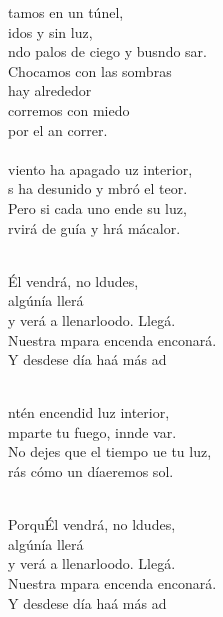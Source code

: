 \begin{cancion}%
	tamos en un túnel, \\
	idos y sin luz,\\
	ndo palos de ciego y busndo sar.\\
Chocamos con las sombras \\
	hay alrededor\\
	corremos con miedo \\
	por el an correr.\\
\jump\\
	 viento ha apagado uz interior,\\
	s ha desunido y mbró el teor.\\
	Pero si cada uno ende su luz,\\
	rvirá de guía y hrá mácalor.\\\jump\\
	\begin{chorus}%
	Él vendrá, no ldudes, \\
	algúnía llerá\\
	y verá a llenarloodo. Llegá. \\
	Nuestra mpara encenda enconará. \\
	Y desdese día haá más ad\\
	\end{chorus}%
	\jump\\
	ntén encendid luz interior,\\
	mparte tu fuego, innde var.\\
	No dejes que el tiempo ue tu luz,\\
	rás cómo un díaeremos  sol.\\\jump\\
	\begin{chorus}%
	PorquÉl vendrá, no ldudes, \\
	algúnía llerá\\
	y verá a llenarloodo. Llegá. \\
	Nuestra mpara encenda enconará. \\
	Y desdese día haá más ad\\
	\end{chorus}%
	\jump\\
\end{cancion}%
